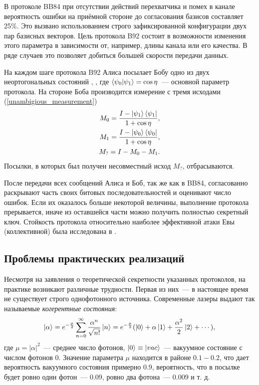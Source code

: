 В протоколе BB84 при отсутствии действий перехватчика и помех в канале вероятность ошибки на приёмной стороне до согласования базисов составляет 25\%. Это вызвано использованием строго зафиксированной конфигурации двух пар базисных векторов. Цель протокола B92 \cite{non_orthogonal_states_discrimination_theorem} состоит в возможности изменения этого параметра в зависимости от, например, длины канала или его качества. В ряде случаев это позволяет добиться большей скорости передачи данных.

На каждом шаге протокола B92 Алиса посылает Бобу одно из двух неортогональных состояний , , где $\left\langle \psi_0|\psi_1\right\rangle = \cos \eta$~--- основной параметр протокола. На стороне Боба производится измерение с тремя исходами (\ref{unambigious_measurement})
\begin{eqnarray}
  M_0 = \frac{I - \left| \psi_1 \right\rangle\left\langle \psi_1 \right|}{1 + \cos \eta}, \nonumber\\
  M_1 = \frac{I - \left| \psi_0 \right\rangle\left\langle \psi_0 \right|}{1 + \cos \eta}, \nonumber\\
  M_? = I - M_0 - M_1.
\end{eqnarray}
Посылки, в которых был получен несовместный исход $M_?$, отбрасываются.

После передачи всех сообщений Алиса и Боб, так же как в BB84, согласованно раскрывают часть своих битовых последовательностей и оценивают число ошибок. Если их оказалось больше некоторой величины, выполнение протокола прерывается, иначе из оставшейся части можно получить полностью секретный ключ. Стойкость протокола относительно наиболее эффективной атаки Евы (коллективной) была исследована в \cite{b92_security_proof}.

\subsection{Проблемы практических реализаций}\label{sec:practical_problems}
Несмотря на заявления о теоретической секретности указанных протоколов, на практике возникают различные трудности.
Первая из них~--- в настоящее время не существует строго однофотонного источника. Современные лазеры выдают так называемые \textit{когерентные состояния}:
\begin{equation}
\left| \alpha \right\rangle = e^{-\frac{\mu}{2}} \sum_{n=0}^\infty \frac{\alpha^n}{\sqrt{n!}} \left| n \right\rangle = e^{-\frac{\mu}{2}}(\left| 0 \right\rangle + \alpha \left| 1 \right\rangle + \frac{\alpha^2}{2}\left| 2 \right\rangle + \cdots),   
\end{equation}
где $\mu = |\alpha|^2$~--- среднее число фотонов, $\left| 0 \right\rangle \equiv \left| vac \right\rangle$~--- вакуумное состояние с числом фотонов 0. Значение параметра $\mu$ находится в районе $0.1-0.2$, что дает вероятность вакуумного состояния примерно $0.9$, вероятность, что в посылке будет ровно один фотон~--- $0.09$, ровно два фотона~--- $0.009$ и т. д.

